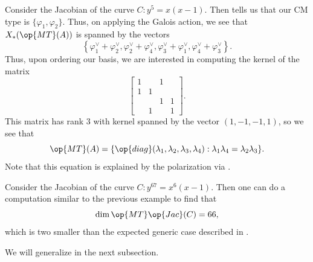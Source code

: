 \documentclass{article}
\begin{document}
\begin{example} \label{ex:basic-fermat}
	Consider the Jacobian of the curve $C\colon y^5=x(x-1)$. Then  tells us that our CM type is $\{\varphi_1,\varphi_2\}$. Thus, on applying the Galois action, we see that $X_*(\op{MT}(A))$ is spanned by the vectors
	\[\left\{\varphi_1^\lor+\varphi_2^\lor,\varphi_2^\lor+\varphi_4^\lor,\varphi_3^\lor+\varphi_1^\lor,\varphi_4^\lor+\varphi_3^\lor\right\}.\]
	Thus, upon ordering our basis, we are interested in computing the kernel of the matrix
	\[\begin{bmatrix}
		1 &   & 1 &   \\
		1 & 1 &   &   \\
		  &   & 1 & 1 \\
		  & 1 &   & 1
	\end{bmatrix}.\]
	This matrix has rank $3$ with kernel spanned by the vector $(1,-1,-1,1)$, so we see that
	\[\op{MT}(A)=\{\op{diag}(\lambda_1,\lambda_2,\lambda_3,\lambda_4):\lambda_1\lambda_4=\lambda_2\lambda_3\}.\]
	Note that this equation is explained by the polarization via .
\end{example}
\begin{example}
	Consider the Jacobian of the curve $C\colon y^{67}=x^6(x-1)$. Then one can do a computation similar to the previous example to find that
	\[\dim\op{MT}\op{Jac}(C)=66,\]
	which is two smaller than the expected generic case described in .
\end{example}
We will generalize  in the next subsection.
\end{document}
